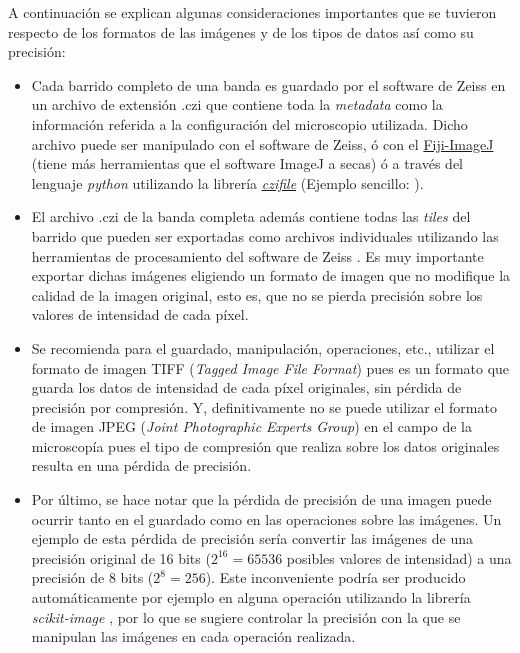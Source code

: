 A continuación se explican algunas consideraciones importantes que se tuvieron respecto de los formatos de las imágenes y de los tipos de datos así como su precisión:
\begin{itemize}
\justifying
\item Cada barrido completo de una banda es guardado por el software de Zeiss en un archivo de extensión .czi que contiene toda la \textit{metadata} como la información referida a la configuración del microscopio utilizada. Dicho archivo puede ser manipulado con el software de Zeiss, ó con el \href{https://imagej.net/Fiji}{Fiji-ImageJ} (tiene más herramientas que el software ImageJ a secas) ó a través del lenguaje \textit{python} utilizando la librería \href{https://pypi.org/project/czifile/}{\textit{czifile}} (Ejemplo sencillo: \href{https://github.com/jrr1984/defects_analysis/blob/master/zeiss_cfi.ipynb}{\faGithub}).
\item El archivo .czi de la banda completa además contiene todas las \textit{tiles} del barrido que pueden ser exportadas como archivos individuales utilizando las herramientas de procesamiento del software de Zeiss \cite{tilezeiss}. Es muy importante exportar dichas imágenes eligiendo un formato de imagen que no modifique la calidad de la imagen original, esto es, que no se pierda precisión sobre los valores de intensidad de cada píxel. 
\item Se recomienda para el guardado, manipulación, operaciones, etc., utilizar el formato de imagen TIFF (\textit{Tagged Image File Format}) pues es un formato que guarda los datos de intensidad de cada píxel originales, sin pérdida de precisión por compresión. Y, definitivamente no se puede utilizar el formato de imagen JPEG (\textit{Joint Photographic Experts Group}) en el campo de la microscopía pues el tipo de compresión que realiza sobre los datos originales resulta en una pérdida de precisión.
\item Por último, se hace notar que la pérdida de precisión de una imagen puede ocurrir tanto en el guardado como en las operaciones sobre las imágenes. Un ejemplo de esta pérdida de precisión sería convertir las imágenes de una precisión original de 16 bits ($2^{16} = 65536$ posibles valores de intensidad) a una precisión de 8 bits ($2^{8} = 256$). Este inconveniente podría ser producido automáticamente por ejemplo en alguna operación utilizando la librería \textit{scikit-image} \cite{van2014scikit}, por lo que se sugiere controlar la precisión con la que se manipulan las imágenes en cada operación realizada.
\end{itemize}

